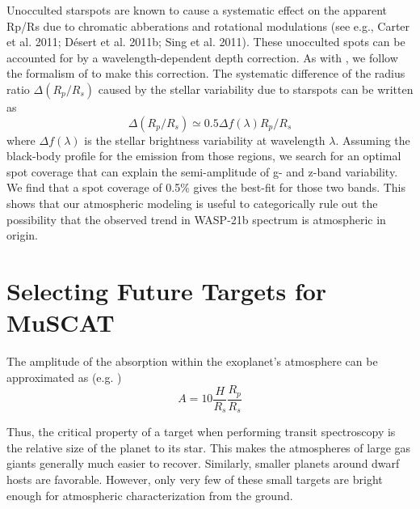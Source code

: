 Unocculted starspots are known to cause a systematic effect on the apparent Rp/Rs due to chromatic abberations and rotational modulations (see e.g., Carter et al. 2011; Désert et al. 2011b; Sing et al. 2011). 
These unocculted spots can be accounted for by a wavelength-dependent depth correction. As with \cite{Narita2013}, %
we follow the formalism of \cite{Sing2011} to make this correction. %
The systematic difference of the radius ratio $\Delta(R_p/R_s)$ caused by the stellar variability due to starspots can be written as
\begin{equation}
 \Delta(R_p/R_s) \simeq 0.5 \Delta f(\lambda) R_p/R_s
\end{equation}
where  $\Delta f(\lambda)$ is the stellar brightness variability at wavelength $\lambda$. 
Assuming the black-body profile for the emission from those regions, we search for an optimal spot coverage that can explain the semi-amplitude of g- and z-band variability. We find that a spot coverage of 0.5\% gives the best-fit for those two bands. This shows that our atmospheric modeling is useful to categorically rule out the possibility that the observed trend in WASP-21b spectrum is atmospheric in origin. 


\section{Selecting Future Targets for MuSCAT \label{sec:targetselection}}
The amplitude of the absorption within the exoplanet's atmosphere can be approximated as (e.g. \cite{Encrenaz2014})
\begin{equation}
A=10\frac{H}{R_s}\frac{R_p}{R_s}
\end{equation}

Thus, the critical property of a target when performing transit spectroscopy is the relative size of the planet to its star. This makes the atmospheres of large gas giants generally much easier to recover. Similarly, smaller planets around dwarf hosts are favorable. %
However, only very few of these small targets are bright enough for atmospheric characterization from the ground. 

